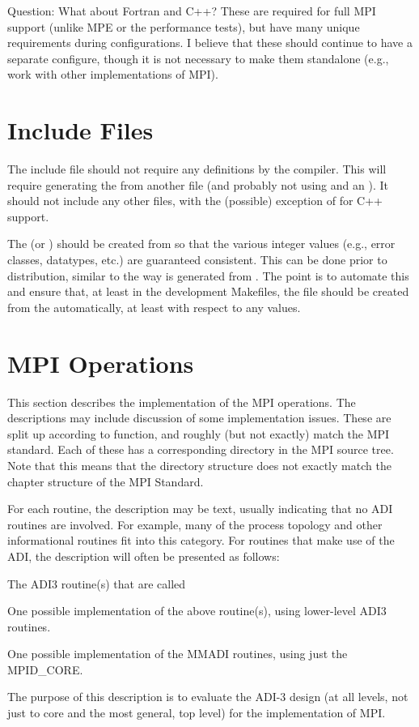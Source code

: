 \documentclass{article}
\begin{document}
Question: What about Fortran and C++?  These are required for full MPI support
(unlike MPE or the performance tests), but have many unique requirements
during configurations.  I believe that these should continue to have a
separate configure, though it is not necessary to make them standalone (e.g.,
work with other implementations of MPI).

\section{Include Files}
The include file  should not require any 
definitions by the compiler.  This will require generating the
 from another file (and probably not using  and an
).  It should not include any other
files, with the (possible) exception of  for C++ support.

The  (or ) should be created from
 so that the various integer values (e.g., error classes,
datatypes, etc.) are guaranteed consistent.  This can be done prior to
distribution, similar to the way  is generated from
.  The point is to automate this and ensure that,
at least in the development Makefiles, the  file
should be created from the  automatically, at least with
respect to any values. 

\section{MPI Operations}
This section describes the implementation of the MPI operations.  The
descriptions may include discussion of some implementation issues.
These are split up according to function, and roughly (but not
exactly) match the MPI standard.  Each of these has a corresponding
directory in the MPI source tree.  Note that this means that the
directory structure does not exactly match the chapter structure of
the MPI Standard.

For each routine, the description may be text, usually indicating that no ADI
routines are involved.  For example, many of the process topology and other
informational routines fit into this category.
For routines that make use of the ADI, the description will often be presented
as follows:
\begin{adi3}The ADI3 routine(s) that are called
\begin{mmadi}One possible implementation of the above routine(s), using
  lower-level ADI3 routines.
\begin{core}One possible implementation of the MMADI routines, using just the
  MPID_CORE. 
\end{core}
\end{mmadi}
\end{adi3}
The purpose of this description is to evaluate the ADI-3 design (at all
levels, not just to core and the most general, top level) for the
implementation of MPI.  
\end{document}
